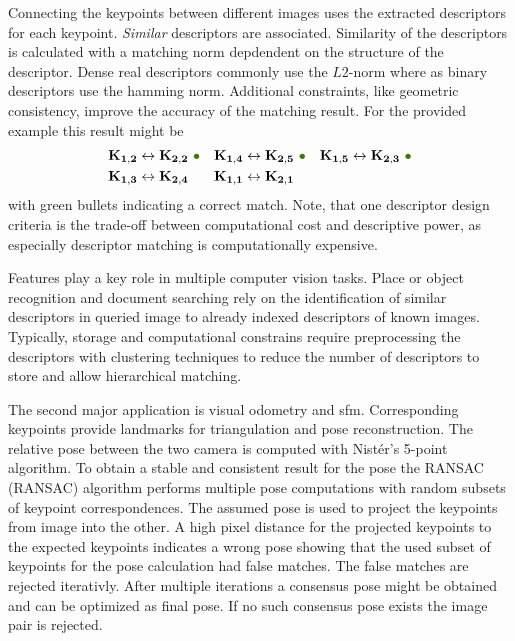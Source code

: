 Connecting the keypoints between different images uses the extracted descriptors for each keypoint.
\emph{Similar} descriptors are associated.
Similarity of the descriptors is calculated with a matching norm depdendent on the structure of the descriptor.
Dense real descriptors commonly use the $L2$-norm where as binary descriptors use the hamming norm.
Additional constraints, like geometric consistency, improve the accuracy of the matching result.
For the provided example this result might be
\begin{align*}
    \mathbf{K_{1,2}} &\leftrightarrow \mathbf{K_{2,2}}~\textcolor{darkgreen}{\bullet} &
    \mathbf{K_{1,4}} &\leftrightarrow \mathbf{K_{2,5}}~\textcolor{darkgreen}{\bullet} &
    \mathbf{K_{1,5}} &\leftrightarrow \mathbf{K_{2,3}}~\textcolor{darkgreen}{\bullet} \\
    \mathbf{K_{1,3}} &\leftrightarrow \mathbf{K_{2,4}} &
    \mathbf{K_{1,1}} &\leftrightarrow \mathbf{K_{2,1}} &
\end{align*}
with green bullets indicating a correct match.
Note, that one descriptor design criteria is the trade-off between computational cost and descriptive power, as especially descriptor matching is computationally expensive.

Features play a key role in multiple computer vision tasks.
Place or object recognition and document searching rely on the identification of similar descriptors in queried image to already indexed descriptors of known images.
Typically, storage and computational constrains require preprocessing the descriptors with clustering techniques to reduce the number of descriptors to store and allow hierarchical matching.

The second major application is visual odometry and \gls{sfm}.
Corresponding keypoints provide landmarks for triangulation and pose reconstruction.
The relative pose between the two camera is computed with Nistér's 5-point algorithm\cite{nister_ieee2004}.
To obtain a stable and consistent result for the pose the \acrshort{RANSAC} (\acrlong{RANSAC})\cite{fischler_ransac_1980} algorithm performs multiple pose computations with random subsets of keypoint correspondences.
The assumed pose is used to project the keypoints from image into the other.
A high pixel distance for the projected keypoints to the expected keypoints indicates a wrong pose showing that the used subset of keypoints for the pose calculation had false matches.
The false matches are rejected iterativly.
After multiple iterations a consensus pose might be obtained and can be optimized as final pose.
If no such consensus pose exists the image pair is rejected.


